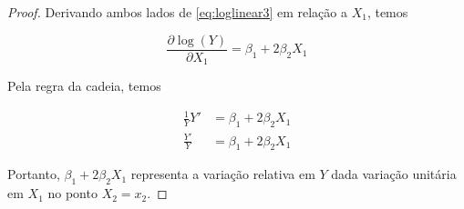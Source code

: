 \begin{apendicesenv}
\begin{proof}
  Derivando ambos lados de \eqref{eq:loglinear3} em relação a $X_1$, temos

  \begin{equation} \label{eq:derivada1}
    \frac{\partial \log(Y)}{\partial X_1} = \beta_1 + 2\beta_2X_1
  \end{equation}

  Pela regra da cadeia, temos

  $$
  \begin{aligned}
    \frac{1}{Y}Y' &= \beta_1 + 2\beta_2X_1\\
    \frac{Y'}{Y} &= \beta_1 + 2\beta_2X_1
  \end{aligned}
  $$

  Portanto, $\beta_1 + 2 \beta_2X_1$ representa a variação relativa em $Y$ dada variação unitária em $X_1$ no ponto $X_2 = x_2$.
\end{proof}
  
\end{apendicesenv}

%
%
